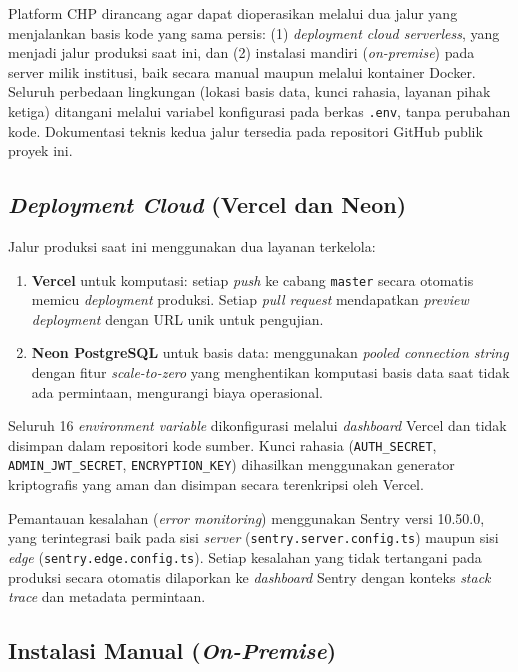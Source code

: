 Platform CHP dirancang agar dapat dioperasikan melalui dua jalur yang menjalankan basis kode yang sama persis: (1) \textit{deployment cloud serverless}, yang menjadi jalur produksi saat ini, dan (2) instalasi mandiri (\textit{on-premise}) pada server milik institusi, baik secara manual maupun melalui kontainer Docker. Seluruh perbedaan lingkungan (lokasi basis data, kunci rahasia, layanan pihak ketiga) ditangani melalui variabel konfigurasi pada berkas \texttt{.env}, tanpa perubahan kode. Dokumentasi teknis kedua jalur tersedia pada repositori GitHub publik proyek ini.

\subsection{\textit{Deployment Cloud} (Vercel dan Neon)}
\label{subsec:deploy-cloud}

Jalur produksi saat ini menggunakan dua layanan terkelola:

\begin{enumerate}[leftmargin=2cm]
  \item \textbf{Vercel} untuk komputasi: setiap \textit{push} ke cabang \texttt{master} secara otomatis memicu \textit{deployment} produksi. Setiap \textit{pull request} mendapatkan \textit{preview deployment} dengan URL unik untuk pengujian.
  \item \textbf{Neon PostgreSQL} untuk basis data: menggunakan \textit{pooled connection string} dengan fitur \textit{scale-to-zero} yang menghentikan komputasi basis data saat tidak ada permintaan, mengurangi biaya operasional.
\end{enumerate}

Seluruh 16 \textit{environment variable} dikonfigurasi melalui \textit{dashboard} Vercel dan tidak disimpan dalam repositori kode sumber. Kunci rahasia (\texttt{AUTH\_SECRET}, \texttt{ADMIN\_JWT\_SECRET}, \texttt{ENCRYPTION\_KEY}) dihasilkan menggunakan generator kriptografis yang aman dan disimpan secara terenkripsi oleh Vercel.

Pemantauan kesalahan (\textit{error monitoring}) menggunakan Sentry versi 10.50.0, yang terintegrasi baik pada sisi \textit{server} (\texttt{sentry.server.config.ts}) maupun sisi \textit{edge} (\texttt{sentry.edge.config.ts}). Setiap kesalahan yang tidak tertangani pada produksi secara otomatis dilaporkan ke \textit{dashboard} Sentry dengan konteks \textit{stack trace} dan metadata permintaan.

\subsection{Instalasi Manual (\textit{On-Premise})}
\label{subsec:instalasi-manual}

